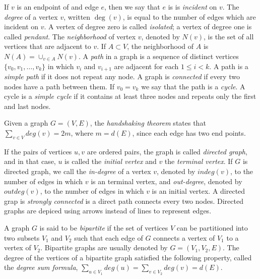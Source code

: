 If $v$ is an endpoint of and edge $e$, then we say that $e$ is is \emph{incident} on $v$. The \emph{degree} of a vertex $v$, written $\deg(v)$, is equal to the number of edges which are incident on $v$. A vertex of degree zero is called \emph{isolated}; a vertex of degree one is called \emph{pendant}. The \emph{neighborhood} of vertex $v$, denoted by $N(v)$, is the set of all vertices that are adjacent to $v$. If $A \subset V$, the neighborhood of $A$ is $N(A) = \cup_{v \in A} N(v)$. A \emph{path} in a graph is a sequence of distinct vertices $\{v_{0}, v_{1}, \ldots ,v_{k}\}$ in which $v_{i}$ and $v_{i+1}$ are adjacent for each $1 \leq i < k$. A path is a \emph{simple path} if it does not repeat any node. A graph is \emph{connected} if every two nodes have a path between them. If $v_{0} = v_{k}$ we say that the path is a \emph{cycle}. A cycle is a \emph{simple cycle} if it contains at least three nodes and repeats only the first and last nodes. 

\begin{example}
Given a graph $G=(V,E)$, the \emph{handshaking theorem} states that $\sum_{v \in V} deg(v) = 2 m$, where $m = d(E)$, since each edge has two end points.
\end{example}

If the pairs of vertices $u, v$ are ordered pairs, the graph is called \emph{directed graph}, and in that case, $u$ is called the \emph{initial vertex} and $v$ the \emph{terminal vertex}. If $G$ is directed graph, we call the \emph{in-degree} of a vertex $v$, denoted by $indeg(v)$, to the number of edges in which $v$ is an terminal vertex, and \emph{out-degree}, denoted by $outdeg(v)$, to the number of edges in which $v$ is an initial vertex. A directed grap is \emph{strongly connected} is a direct path connects every two nodes. Directed graphs are depiced using arrows instead of lines to represent edges.

A graph $G$ is said to be \emph{bipartite} if the set of vertices $V$ can be partitioned into two subsets $V_1$ and $V_2$ such that each edge of $G$ connects a vertex of $V_1$ to a vertex of $V_2$. Bipartite graphs are usually denoted by $G=(V_1, V_2, E)$. The degree of the vertices of a bipartite graph satisfied the following property, called the \emph{degree sum formula}, $\sum_{u \in V_1} deg(u) = \sum_{v \in V_2} deg(v) = d(E)$.


